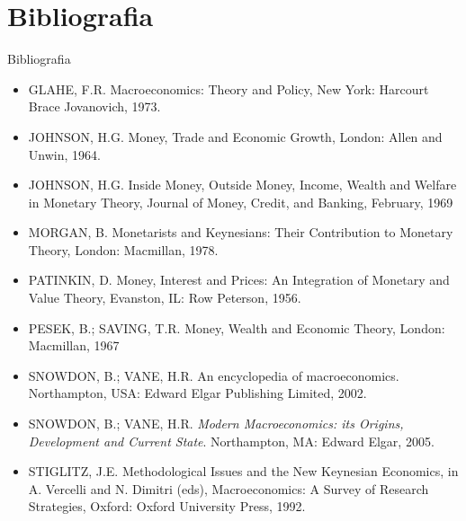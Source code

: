 \documentclass[10pt]{beamer}
\begin{document}
\section{Bibliografia}
\begin{frame}{ Bibliografia}
    \begin{itemize}                
        \item GLAHE, F.R. Macroeconomics: Theory and Policy, New York: Harcourt Brace Jovanovich, 1973.\medskip
        \item JOHNSON, H.G. Money, Trade and Economic Growth, London: Allen and Unwin, 1964.\medskip
        \item JOHNSON, H.G. Inside Money, Outside Money, Income, Wealth and Welfare in Monetary Theory, Journal of Money, Credit, and Banking, February, 1969\medskip
        \item MORGAN, B. Monetarists and Keynesians: Their Contribution to Monetary Theory, London: Macmillan, 1978.\medskip
        \item PATINKIN, D. Money, Interest and Prices: An Integration of Monetary and Value Theory, Evanston, IL: Row Peterson, 1956.\medskip
        \item PESEK, B.; SAVING, T.R. Money, Wealth and Economic Theory, London: Macmillan, 1967\medskip
        \item SNOWDON, B.; VANE, H.R. An encyclopedia of macroeconomics. Northampton, USA: Edward Elgar Publishing Limited, 2002.\medskip
        \item SNOWDON, B.; VANE, H.R. \emph{Modern Macroeconomics: its Origins, Development and Current State}. Northampton, MA: Edward Elgar, 2005.\medskip
        \item STIGLITZ, J.E. Methodological Issues and the New Keynesian Economics, in A. Vercelli and N. Dimitri (eds), Macroeconomics: A Survey of Research Strategies, Oxford: Oxford University Press, 1992.
    \end{itemize}
\end{frame}
\end{document}
